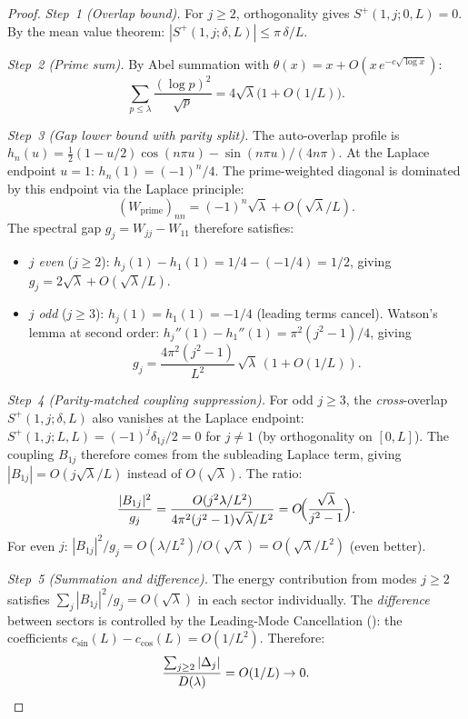 \documentclass[12pt,a4paper]{article}
\theoremstyle{definition}
\theoremstyle{remark}
\begin{document}
\begin{proof}
\emph{Step~1 (Overlap bound).} For $j \geq 2$, orthogonality gives $S^+(1,j;0,L) = 0$. By the mean value theorem: $|S^+(1,j;\delta,L)| \leq \pi\,\delta/L$.

\emph{Step~2 (Prime sum).} By Abel summation with $\theta(x) = x + O(x\,e^{-c\sqrt{\log x}})$:
\[
  \sum_{p \leq \lambda}\frac{(\log p)^2}{\sqrt{p}} = 4\sqrt{\lambda}\bigl(1 + O(1/L)\bigr).
\]

\emph{Step~3 (Gap lower bound with parity split).} The auto-overlap profile is $h_n(u) = \tfrac{1}{2}(1-u/2)\cos(n\pi u) - \sin(n\pi u)/(4n\pi)$. At the Laplace endpoint $u = 1$: $h_n(1) = (-1)^n/4$. The prime-weighted diagonal is dominated by this endpoint via the Laplace principle:
\[
  (W_{\mathrm{prime}})_{nn} = (-1)^n\sqrt{\lambda} + O(\sqrt{\lambda}/L).
\]
The spectral gap $g_j = W_{jj} - W_{11}$ therefore satisfies:
\begin{itemize}
  \item \emph{$j$ even} ($j \geq 2$): $h_j(1) - h_1(1) = 1/4 - (-1/4) = 1/2$, giving $g_j = 2\sqrt{\lambda} + O(\sqrt{\lambda}/L)$.
  \item \emph{$j$ odd} ($j \geq 3$): $h_j(1) = h_1(1) = -1/4$ (leading terms cancel). Watson's lemma at second order: $h_j''(1) - h_1''(1) = \pi^2(j^2-1)/4$, giving
  \begin{equation}
  \label{eq:gap-odd}
    g_j = \frac{4\pi^2(j^2-1)}{L^2}\,\sqrt{\lambda}\,(1 + O(1/L)).
  \end{equation}
\end{itemize}

\emph{Step~4 (Parity-matched coupling suppression).} For odd $j \geq 3$, the \emph{cross}-overlap $S^+(1,j;\delta,L)$ also vanishes at the Laplace endpoint: $S^+(1,j;L,L) = (-1)^j\delta_{1j}/2 = 0$ for $j \neq 1$ (by orthogonality on $[0,L]$). The coupling $B_{1j}$ therefore comes from the subleading Laplace term, giving $|B_{1j}| = O(j\sqrt{\lambda}/L)$ instead of $O(\sqrt{\lambda})$. The ratio:
\[
  \frac{|B_{1j}|^2}{g_j} = \frac{O(j^2\lambda/L^2)}{4\pi^2(j^2-1)\sqrt{\lambda}/L^2} = O\!\Bigl(\frac{\sqrt{\lambda}}{j^2-1}\Bigr).
\]
For even $j$: $|B_{1j}|^2/g_j = O(\lambda/L^2)/O(\sqrt{\lambda}) = O(\sqrt{\lambda}/L^2)$ (even better).

\emph{Step~5 (Summation and difference).} The energy contribution from modes $j \geq 2$ satisfies $\sum_j |B_{1j}|^2/g_j = O(\sqrt{\lambda})$ in each sector individually. The \emph{difference} between sectors is controlled by the Leading-Mode Cancellation (): the coefficients $c_{\sin}(L) - c_{\cos}(L) = O(1/L^2)$. Therefore:
\[
  \frac{\sum_{j \geq 2}|\Delta_j|}{D(\lambda)} = O(1/L) \to 0. \qedhere
\]
\end{proof}
\end{document}
